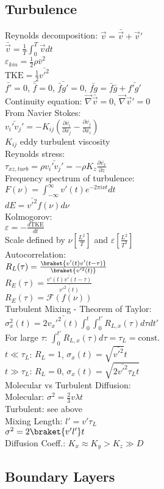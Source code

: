 \subsection*{Turbulence}
Reynolds decomposition: $\vec{v}=\bar{\vec{v}}+\vec{v}'$\\
$\bar{\vec{v}}=\frac{1}{T}\int_0^T\vec{v}dt$\\
$\varepsilon_{kin}=\frac{1}{2}\rho\bar{v}^2$\\
$\text{TKE}=\frac{1}{2}\bar{v'^2}$\\
$\bar{f'}=0$, $\bar{\bar{f}}=0$, $\bar{\bar{f}g'}=0$, $\bar{fg}=\bar{f}\bar{g}+\bar{f'g'}$\\
Continuity equation: $\vec{\nabla}\bar{\vec{v}}=0$, $\vec{\nabla}\vec{v}'=0$\\
From Navier Stokes:\\
$\bar{v_i'v_j'}=-K_{ij}\left(\frac{\partial\bar{v_i}}{\partial x_j}-\frac{\partial\bar{v_j}}{\partial x_i}\right)$\\
$K_{ij}$ eddy turbulent viscosity\\
Reynolds stress:\\
$\tau_{xz,turb}=\rho\bar{v_i'v_j'}=-\rho K_z\frac{\partial\bar{v_x}}{\partial z}$\\
Frequency spectrum of turbulence:\\
$F(\nu)=\int_{-\infty}^{\infty}v'(t)e^{-2\pi i\nu t}dt$\\
$dE = \bar{v'^2}f(\nu)d\nu$\\
Kolmogorov:\\
$\varepsilon = -\frac{d\text{TKE}}{dt}$\\
Scale defined by $\nu [\frac{L^2}{T}]$ and $\varepsilon [\frac{L^2}{T^3}]$\\
Autocorrelation:\\
$R_L(\tau)=\frac{\braket{v'(t)v'(t-\tau)}}{\braket{v'^2(t)}}$\\
$R_E(\tau)=\frac{\bar{v'(t)v'(t-\tau)}}{\bar{v'^2(t)}}$\\
$R_E(\tau)=\mathcal{F}(f(\nu))$\\
Turbulent Mixing - Theorem of Taylor:\\
$\sigma_x^2(t)=2\bar{v_x'^2(t)}\int_0^t\int_0^{t'}R_{L,x}(\tau)d\tau dt'$\\
For large $\tau$: $\int_0^{t'}R_{L,x}(\tau)d\tau=\tau_L=\text{const.}$\\
$t\ll\tau_L$: $R_L=1$, $\sigma_x(t)=\sqrt{\bar{v'^2}}t$\\
$t\gg\tau_L$: $R_L=0$, $\sigma_x(t)=\sqrt{2\bar{v'^2}\tau_L t}$\\
Molecular vs Turbulent Diffusion:\\
Molecular: $\sigma^2=\frac{2}{3}v\lambda t$\\
Turbulent: see above\\
Mixing Length: $l'=v'\tau_L$\\
$\sigma^2=2\braket{v'l'}t$\\
Diffusion Coeff.: $K_x \approx K_y > K_z \gg D$
\subsection*{Boundary Layers}